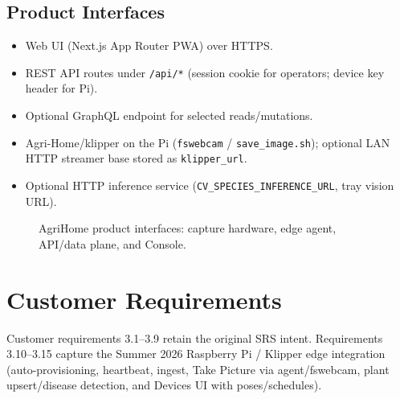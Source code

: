 \documentclass[11pt,letterpaper]{article}
\begin{document}
\subsection{Product Interfaces}
\begin{itemize}
  \item Web UI (Next.js App Router PWA) over HTTPS.
  \item REST API routes under \texttt{/api/*} (session cookie for operators; device key header for Pi).
  \item Optional GraphQL endpoint for selected reads/mutations.
  \item Agri-Home/klipper on the Pi (\texttt{fswebcam} / \texttt{save\_image.sh}); optional LAN HTTP
        streamer base stored as \texttt{klipper\_url}.
  \item Optional HTTP inference service (\texttt{CV\_SPECIES\_INFERENCE\_URL}, tray vision URL).
\end{itemize}

\begin{figure}[H]
\centering
{}
\caption{AgriHome product interfaces: capture hardware, edge agent, API/data plane, and Console.}
\label{fig:srs-arch}
\end{figure}

\section{Customer Requirements}
Customer requirements 3.1--3.9 retain the original SRS intent. Requirements 3.10--3.15 capture the
Summer 2026 Raspberry Pi / Klipper edge integration (auto-provisioning, heartbeat, ingest,
Take Picture via agent/fswebcam, plant upsert/disease detection, and Devices UI with poses/schedules).
\end{document}

